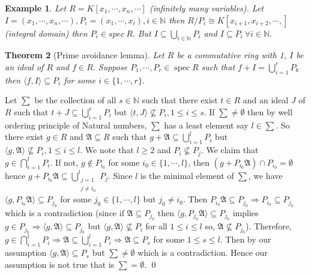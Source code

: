 \documentclass[11pt]{amsart}
\newtheorem{theorem}{Theorem}[section]
\newtheorem{example}[theorem]{Example}%
\newcommand{\NN}{\mathbb N}
\newcommand{\gen}[1]{\langle#1\rangle}
\DeclareMathOperator{\spec}{\text{spec}}
\begin{document}
\begin{example}

Let $R=K[x_1,\cdots ,x_n,\cdots]$ (infinitely many variables). Let $I=(x_1,\cdots ,x_n,\cdots ),P_i=(x_1,\cdots ,x_i),i\in {\NN}$ then $R/P_i\cong K[x_{i+1},x_{i+2},\cdots ,]$ (integral domain) then $P_i\in spec~R.$ But $I\subseteq \displaystyle\bigcup_{i\in {\NN}} P_i$ and $I\subseteq P_i~\forall i\in {\NN}.$

\end{example}

\begin{theorem}[Prime avoidance lemma]

Let $R$ be a commutative ring with 1, $I$ be an ideal of $R$ and $f\in R.$ Suppose $P_1,\cdots,P_r\in\spec R$ such that $f+I=\displaystyle\bigcup_{i=1}^r P_k$ then $\gen{f,I}\subseteq P_i$ for some $i\in\{1,\cdots,r\}.$

\end{theorem}

\proof Let $\displaystyle\sum$ be the collection of all $s\in{\NN}$ such that there exist $t\in R$ and an ideal $J$ of $R$ such that $t+J\subseteq \displaystyle\bigcup_{i=1}^s P_i$ but $\gen{t,J}\nsubseteq P_i,1\leq i\leq s.$ If $\displaystyle\sum\neq\emptyset$ then by well ordering principle of Natural numbers, $\displaystyle\sum$ has a least element say $l\in \displaystyle\sum.$ So there exist $g\in R$ and $\mathfrak{A}\subseteq R$ such that $g+\mathfrak{A}\subseteq \displaystyle\bigcup_{i=1}^l P_i$ but $\gen{g,\mathfrak{A}}\nsubseteq P_i,1\leq i\leq l.$ We note that $l\geq 2$ and $P_i\nsubseteq P_j.$ We claim that $g\in\displaystyle\bigcap_{i=1}^l P_i.$ If not, $g\notin P_{i_0}$ for some $i_0\in\{1,\cdots,l\}$, then $(g+P_{i_0}\mathfrak{A})\cap P_{i_0}=\emptyset$ hence $g+P_{i_0}\mathfrak{A}\subseteq \displaystyle\bigcup_{\substack{j=1\\j\neq i_0}}^l P_j.$ Since $l$ is the minimal element of $\displaystyle\sum$, we have $\gen{g,P_{i_0}\mathfrak{A}}\subseteq P_{j_0}$ for some $j_0\in\{1,\cdots, l\}$ but $j_0\neq i_0.$ Then $P_{i_0}\mathfrak{A}\subseteq P_{j_0} \Rightarrow P_{i_0}\subseteq P_{j_0}$ which is a contradiction (since if $\mathfrak{A}\subseteq P_{j_0}$ then $\gen{g,P_{j_0}\mathfrak{A}}\subseteq P_{j_0}$ implies $g\in P_{j_0} \Rightarrow \gen{g,\mathfrak{A}}\subseteq P_{j_0}$ but $\gen{g,\mathfrak{A}}\nsubseteq P_i$ for all $1\leq i\leq l$ so, $\mathfrak{A}\nsubseteq P_{j_0}$). Therefore, $g\in\displaystyle\bigcap_{i=1}^l P_i \Rightarrow \mathfrak{A}\subseteq \displaystyle\bigcup_{i=1}^l P_i\Rightarrow \mathfrak{A}\subseteq P_s$ for some $1\leq s\leq l.$ Then by our assumption $\gen{g,\mathfrak{A}}\subseteq P_s$ but $\displaystyle\sum\neq \emptyset$ which is a contradiction. Hence our assumption is not true that is $\displaystyle\sum=\emptyset.$ \qed
\end{document}
